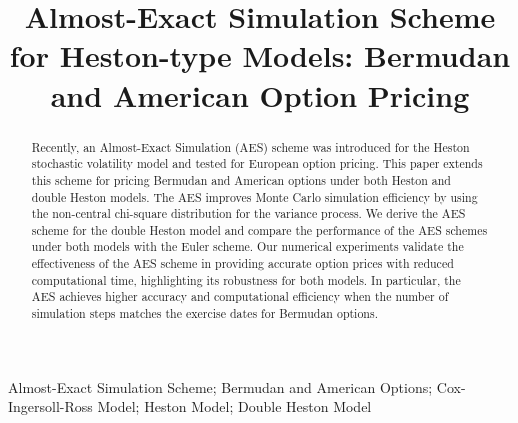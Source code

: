 \documentclass[]{interact}
\theoremstyle{plain}%
\theoremstyle{definition}
\theoremstyle{remark}
\begin{document}

\title{Almost-Exact Simulation Scheme for Heston-type Models: Bermudan and American Option Pricing}






\author{
}

\maketitle 


\begin{abstract}
Recently, an Almost-Exact Simulation (AES) scheme was introduced for the Heston stochastic volatility model and tested for European option pricing. This paper extends this scheme for pricing Bermudan and American options under both Heston and double Heston models. The AES improves Monte Carlo simulation efficiency by using the non-central chi-square distribution for the variance process. We derive the AES scheme for the double Heston model and compare the performance of the AES schemes under both models with the Euler scheme. Our numerical experiments validate the effectiveness of the AES scheme in providing accurate option prices with reduced computational time, highlighting its robustness for both models. In particular, the AES achieves higher accuracy and computational efficiency when the number of simulation steps matches the exercise dates for Bermudan options. 
\end{abstract}

\begin{keywords}
Almost-Exact Simulation Scheme; Bermudan and American Options; Cox-Ingersoll-Ross Model; Heston Model; Double Heston Model
\end{keywords}
\end{document}
